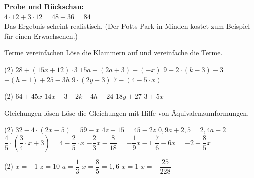 \documentclass[12pt,a5paper,landscape]{scrartcl}
\begin{document}
\begin{loesungskarte}
\textbf{Probe und Rückschau:} \\
$4\cdot 12 + 3\cdot 12 = 48 + 36 = 84$ \checkmark\\[5mm]
Das Ergebnis scheint realistisch. (Der Potts Park in Minden kostet zum Beispiel  für einen Erwachsenen.)
\end{loesungskarte}

\begin{karte1}{Terme vereinfachen}
	Löse die Klammern auf und vereinfache die Terme.
	
	\begin{tasks}(2)
		\task $28 + (15x + 12) \cdot 3$
		\task $15a - (2a + 3) - (-x)$
		\task $9 - 2\cdot ( k-3) - 3$
		\task $-(h + 1) + 25 -3h$
		\task $9 \cdot(2y + 3)$
		\task $7-(4-5\cdot x)$
	\end{tasks}
\end{karte1}

\begin{loesungskarte}
	\begin{tasks}(2)
		\task $64 + 45x$
		\task $14x - 3$
		\task $-2k$
		\task $-4h + 24$
		\task $18y + 27$
		\task $3 + 5x$
	\end{tasks}
\end{loesungskarte}

\begin{karte1}{Gleichungen lösen}
	Löse die Gleichungen mit Hilfe von Äquivalenzumformungen.
	
	\begin{tasks}(2)
		\task $32 - 4\cdot (2x - 5) = 59 -x $
		\task $4z - 15 = 45 - 2z$
		\task $0,9a + 2,5 = 2,4a - 2$
		\task $\dfrac{4}{5} \cdot \left( \dfrac{3}{4} \cdot x + 3 \right) = 4 - \dfrac{2}{5}\cdot  x$
		\task $-\dfrac{2}{3}x - \dfrac{8}{18} = -\dfrac{1}{9}x - 1$
		\task $\dfrac{7}{6} - 6x = -2 + \dfrac{8}{5}x$
	\end{tasks}
\end{karte1}

\begin{loesungskarte}
	\begin{tasks}(2)
		\task $x = -1$
		\task $z = 10$
		\task $a = \dfrac{1}{3}$
		\task $x = \dfrac{8}{5} = 1,6$
		\task $x = 1$
		\task $x = -\dfrac{25}{228}$
	\end{tasks}
\end{loesungskarte}
\end{document}
